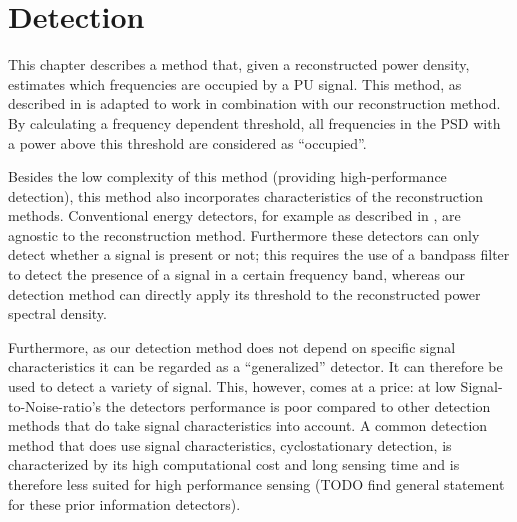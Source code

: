 \documentclass[a4paper, openany, oneside]{memoir}
\begin{document}
\chapter{Detection}
This chapter describes a method that, given a reconstructed power density, estimates which frequencies are occupied by a PU signal. This method, as described in \cite{ariananda2012compressive} is adapted to work in combination with our reconstruction method. By calculating a frequency dependent threshold, all frequencies in the PSD with a power above this threshold are considered as ``occupied''. 

Besides the low complexity of this method  (providing high-performance detection), this method also incorporates characteristics of the reconstruction methods. Conventional energy detectors, for example as described in \cite{???}, are agnostic to the reconstruction method. Furthermore these detectors can only detect whether a signal is present or not; this requires the use of a bandpass filter to detect the presence of  a signal in a certain frequency band, whereas our detection method can directly apply its threshold to the reconstructed power spectral density.

Furthermore, as our detection method does not depend on specific signal characteristics it can be regarded as a ``generalized'' detector. It can therefore be used to detect a variety of signal. This, however, comes at a price: at low Signal-to-Noise-ratio's the detectors performance is poor \cite{???} compared to other detection methods that do take signal characteristics into account. A common detection method that does use signal characteristics, cyclostationary detection, is characterized by its high computational cost and long sensing time and is therefore less suited for high performance sensing (TODO find general statement for these prior information detectors). 

\end{document}
